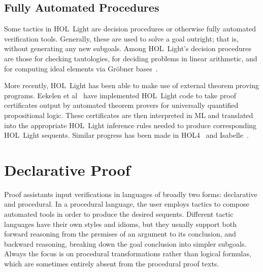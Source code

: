 \subsection{Fully Automated Procedures}
Some tactics in HOL~Light are decision procedures or otherwise fully automated verification tools. Generally, these are used to solve a goal outright; that is, without generating any new subgoals. Among HOL~Light's decision procedures are those for checking tautologies, for deciding problems in linear arithmetic, and for computing ideal elements via Gr\"{o}bner bases~\cite{BuchbergerGrobner}.

More recently, HOL~Light has been able to make use of external theorem proving programs. Eekelen et al~\cite{HOLLightBoolean} have implemented HOL~Light code to take proof certificates output by automated theorem provers for universally quantified propositional logic. These certificates are then interpreted in ML and translated into the appropriate HOL~Light inference rules needed to produce corresponding HOL~Light sequents. Similar progress has been made in HOL4~\cite{HOLBoolean} and Isabelle~\cite{IsabelleSledgehammer}.

\section{Declarative Proof}\label{sec:DeclarativeProof}
Proof assistants input verifications in languages of broadly two forms: declarative and procedural. In a procedural language, the user employs tactics to compose automated tools in order to produce the desired sequents. Different tactic languages have their own styles and idioms, but they usually support both forward reasoning from the premises of an argument to its conclusion, and backward reasoning, breaking down the goal conclusion into simpler subgoals. Always the focus is on procedural transformations rather than logical formulas, which are sometimes entirely absent from the procedural proof texts. 



